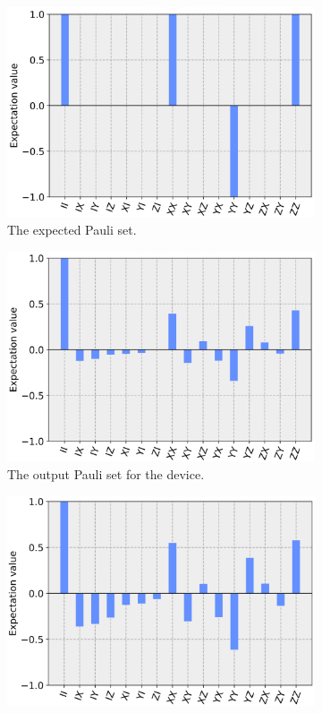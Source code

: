 \begin{figure}[h!]
	\begin{subfigure}{.5\textwidth}
    \centering
		\includegraphics[width=.8\linewidth]{images/results/swap_pauli_sim.png}
		\caption{The expected Pauli set.}
		\label{fig:pur_pauli_sim}
	\end{subfigure} \newline
	\begin{subfigure}{.5\textwidth}
    \centering
		\includegraphics[width=.8\linewidth]{images/results/pur_pauli_dev.png}
		\caption{The output Pauli set for the device.}
		\label{fig:pur_pauli_dev}
	\end{subfigure} \newline
	\begin{subfigure}{.5\textwidth}
    \centering
		\includegraphics[width=.8\linewidth]{images/results/pur_pauli_cal.png}

\end{subfigure}
\end{figure}

